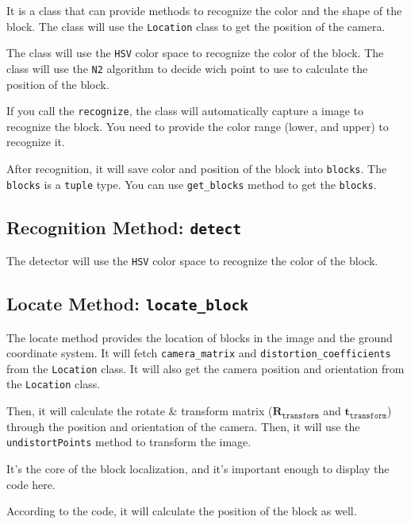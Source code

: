 \documentclass{article}
\begin{document}
It is a class that can provide methods to recognize the color and the shape of the block. The class will use the \texttt{Location} class to get the position of the camera.

The class will use the \texttt{HSV} color space to recognize the color of the block. The class will use the \texttt{N2} algorithm to decide wich point to use to calculate the position of the block.

If you call the \texttt{recognize}, the class will automatically capture a image to recognize the block. You need to provide the color range (lower, and upper) to recognize it.

After recognition, it will save color and position of the block into \texttt{blocks}. The \texttt{blocks} is a \texttt{tuple} type. You can use \texttt{get\_blocks} method to get the \texttt{blocks}.

\subsection{Recognition Method: \texttt{detect}}

The detector will use the \texttt{HSV} color space to recognize the color of the block.



\subsection{Locate Method: \texttt{locate\_block}}
The locate method provides the location of blocks in the image and the ground coordinate system. It will fetch \texttt{camera\_matrix} and \texttt{distortion\_coefficients} from the \texttt{Location} class. It will also get the camera position and orientation from the \texttt{Location} class.

Then, it will calculate the rotate \& transform matrix ($\boldsymbol{R}_{\texttt{transform}}$ and $\boldsymbol{t}_{\texttt{transform}}$) through the position and orientation of the camera. Then, it will use the \texttt{undistortPoints} method to transform the image.

It's the core of the block localization, and it's important enough to display the code here.



According to the code, it will calculate the position of the block as well.
\end{document}
